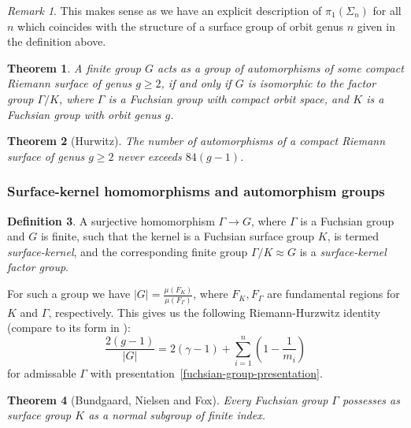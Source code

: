 \documentclass[reqno]{amsart}
\newtheorem{theorem}{Theorem}[section]
\theoremstyle{definition}
\newtheorem{definition}[theorem]{Definition}
\theoremstyle{remark}
\newtheorem*{remark}{Remark}
\begin{document}
\begin{remark}
    This makes sense
    as we have an explicit
    description of
    $\pi_1(\Sigma_n)$ for
    all $n$ which coincides
    with the structure of a surface group of
    orbit genus $n$ given
    in the definition above.
\end{remark}

\begin{theorem}
    A finite group $G$ acts
    as a group of automorphisms
    of some compact Riemann surface
    of genus $g \geq 2$, if
    and only if $G$ is isomorphic to the \textit{factor group}
    $\Gamma /K$, where
    $\Gamma$ is a Fuchsian group with compact orbit space, and $K$ is a Fuchsian group with orbit genus $g$.
\end{theorem}

\begin{theorem}[Hurwitz]
    The number of automorphisms of a compact Riemann surface of genus $g \geq 2$ never exceeds
    $84 (g-1)$.
\end{theorem}



\subsubsection{Surface-kernel homomorphisms and automorphism
groups}

\begin{definition}
    A surjective homomorphism 
    $\Gamma \to G$, where
    $\Gamma$ is a Fuchsian group and $G$ is finite, such that the kernel is a Fuchsian surface group $K$,
    is termed \textit{surface-kernel}, and the corresponding finite group
    $\Gamma / K \approx G$ is
    a \textit{surface-kernel factor group}.
\end{definition}

For such a group we have
$\left| G \right| =
\frac{\mu (F_K)}{\mu(F_{\Gamma})}$,
where $F_K, F_{\Gamma}$ are
fundamental regions for
$K$ and $\Gamma$, respectively.
This gives us
the following Riemann-Hurzwitz
identity (compare to its form
in \cite[Lemma~2.39]{Girondo-Gonzalez-Diez}):
\[
\frac{2(g-1)}{\left|G\right|}
= 2 (\gamma -1) + 
\sum_{i=1}^n \left(1-
\frac{1}{m_i} \right)
\]
for admissable $\Gamma$ with presentation~\ref{fuchsian-group-presentation}.


\begin{theorem}[Bundgaard, Nielsen and Fox]
    Every Fuchsian group $\Gamma$ possesses as surface group $K$ as a normal subgroup of finite index.
\end{theorem}
\end{document}
